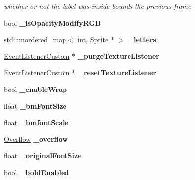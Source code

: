 \begin{DoxyCompactItemize}
\begin{DoxyCompactList}\small\item\em whether or not the label was inside bounds the previous frame \end{DoxyCompactList}\item 
\mbox{\label{classLabel_a88d948055776d84613c9a41696d69e78}} 
bool {\bfseries \+\_\+is\+Opacity\+Modify\+R\+GB}
\item 
\mbox{\label{classLabel_adc87350d3c89450c09fea40c1790e71d}} 
std\+::unordered\+\_\+map$<$ int, \hyperlink{classSprite}{Sprite} $\ast$ $>$ {\bfseries \+\_\+letters}
\item 
\mbox{\label{classLabel_adaa5179d090ab60a1d67aaadcdd26fd1}} 
\hyperlink{classEventListenerCustom}{Event\+Listener\+Custom} $\ast$ {\bfseries \+\_\+purge\+Texture\+Listener}
\item 
\mbox{\label{classLabel_a6c331e0909cffcd45a2d1f12d30e63d4}} 
\hyperlink{classEventListenerCustom}{Event\+Listener\+Custom} $\ast$ {\bfseries \+\_\+reset\+Texture\+Listener}
\item 
\mbox{\label{classLabel_a6dc977f37c7d4b322e5c4141aebd12cd}} 
bool {\bfseries \+\_\+enable\+Wrap}
\item 
\mbox{\label{classLabel_a5912185fd2f803f1b281e646aa6d7948}} 
float {\bfseries \+\_\+bm\+Font\+Size}
\item 
\mbox{\label{classLabel_ac0d00e37ef24f833e07a373bb34c13d3}} 
float {\bfseries \+\_\+bmfont\+Scale}
\item 
\mbox{\label{classLabel_a507194fc6f83dafc6899852e3eac9b1c}} 
\hyperlink{classLabel_af7d31998ea743e8ca64eb1a983fa6a4c}{Overflow} {\bfseries \+\_\+overflow}
\item 
\mbox{\label{classLabel_ab1bac92f6b4c8d08ae8f7bb2d9c1d78d}} 
float {\bfseries \+\_\+original\+Font\+Size}
\item 
\mbox{\label{classLabel_a83847659240985b0f0cefd49a420c246}} 
bool {\bfseries \+\_\+bold\+Enabled}
\item 

\end{DoxyCompactItemize}
